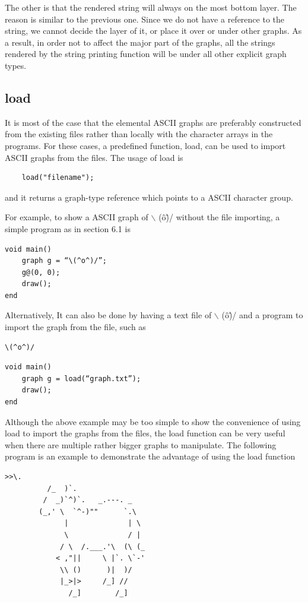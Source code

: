 \documentclass[11pt,letterpaper]{article}
\begin{document}
The other is that the rendered string will always on the most bottom layer. The reason is similar to the previous one. Since we do not have a reference to the string, we cannot decide the layer of it, or place it over or under other graphs. As a result, in order not to affect the major part of the graphs, all the strings rendered by the string printing function will be under all other explicit graph types.

\subsection {load}
It is most of the case that the elemental ASCII graphs are preferably constructed from the existing files rather than locally with the character arrays in the programs. For these cases, a predefined function, load, can be used to import ASCII graphs from the files. The usage of load is
\begin{lstlisting}
	load("filename");
\end{lstlisting}
and it returns a graph-type reference which points to a ASCII character group.

For example, to show a ASCII graph of $\backslash$ (\^o\^)/ without the file importing, a simple program as in section 6.1 is
\begin{lstlisting}[caption=hail.adl, label=hail, captionpos=b]
void main()
	graph g = “\(^o^)/”;
	g@(0, 0);
	draw();
end
\end{lstlisting}

Alternatively, It can also be done by having a text file of $\backslash$ (\^o\^)/ and a program to import the graph from the file, such as

\begin{lstlisting}[caption=graph.txt, label=hail_face, captionpos=b]
	\(^o^)/
\end{lstlisting}

\begin{lstlisting}[caption=hailv2.adl, label=hailv2, captionpos=b]
void main()
	graph g = load(“graph.txt”);
	draw();
end
\end{lstlisting}

Although the above example may be too simple to show the convenience of using load to import the graphs from the files, the load function can be very useful when there are multiple rather bigger graphs to manipulate. The following program is an example to demonstrate the advantage of using the load function

\begin{lstlisting}[caption=graph\_horse.txt, label=horse, captionpos=b]
		   >>\.
		  /_  )`.
		 /  _)`^)`.   _.---. _
		(_,' \  `^-)""      `.\
		      |              | \
		      \              / |
		     / \  /.___.'\  (\ (_
		    < ,"||     \ |`. \`-'
		     \\ ()      )|  )/
		     |_>|>     /_] //
		       /_]        /_]
\end{lstlisting}
\end{document}
